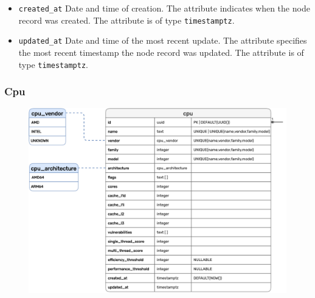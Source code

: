 \begin{itemize}
  \item \texttt{created\_at}
    \newline
    Date and time of creation.
    \newline
    The attribute indicates when the node record was created.
    \newline
    The attribute is of type \texttt{timestamptz}.

  \item \texttt{updated\_at}
    \newline
    Date and time of the most recent update.
    \newline
    The attribute specifies the most recent timestamp the node record was updated.
    \newline
    The attribute is of type \texttt{timestamptz}.
\end{itemize}

\subsubsection{Cpu}
\label{subsubsec:implementation_server_database_cpu}

\begin{figure}[htbp]
  \centering
  \includegraphics[width=.75\textwidth]{images/implementation/erm_cpu.pdf}
\end{figure}


